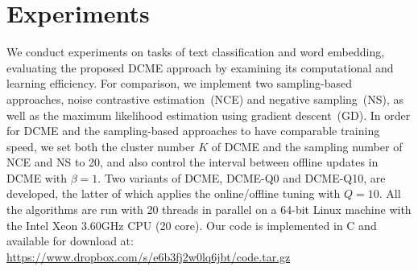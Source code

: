 \section{Experiments}\label{sec::dcme_experiments}

We conduct experiments on tasks of text classification and word embedding,
evaluating the proposed DCME approach by examining its computational and
learning efficiency. For comparison, we implement two sampling-based approaches,
noise contrastive estimation~(NCE) and negative sampling~(NS), as well as the
maximum likelihood estimation using gradient descent~(GD). In order for DCME and
the sampling-based approaches to have comparable training speed, we set both the
cluster number $K$ of DCME and the sampling number of NCE and NS to 20, and also
control the interval between offline updates in DCME with $\beta = 1$. Two
variants of DCME, DCME-Q0 and DCME-Q10, are developed, the latter of which
applies the online/offline tuning with $Q=10$. All the algorithms are run with
20 threads in parallel on a 64-bit Linux machine with the Intel Xeon 3.60GHz CPU
(20 core). Our code is implemented in C and available for download at:
\url{https://www.dropbox.com/s/e6b3fj2w0lq6jbt/code.tar.gz}

